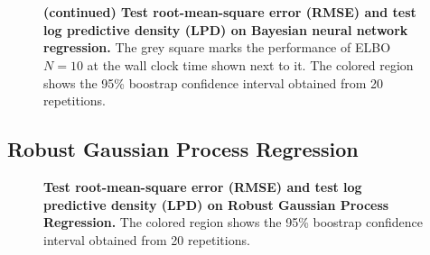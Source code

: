 \begin{figure}[H]
  \centering
  \vspace{0.05in}\\
  \vspace{0.05in}\\
  \caption{\textbf{(continued) Test root-mean-square error (RMSE) and test log predictive density (LPD) on Bayesian neural network regression.}
    The grey square marks the performance of ELBO \(N=10\) at the wall clock time shown next to it.
  The colored region shows the 95\% boostrap confidence interval obtained from 20 repetitions.}
\end{figure}

\subsection{Robust Gaussian Process Regression}\label{section:gp_additional}
\begin{figure}[H]
  \centering
  \caption{\textbf{Test root-mean-square error (RMSE) and test log predictive density (LPD) on Robust Gaussian Process Regression.}
  The colored region shows the 95\% boostrap confidence interval obtained from 20 repetitions.}
\end{figure}

